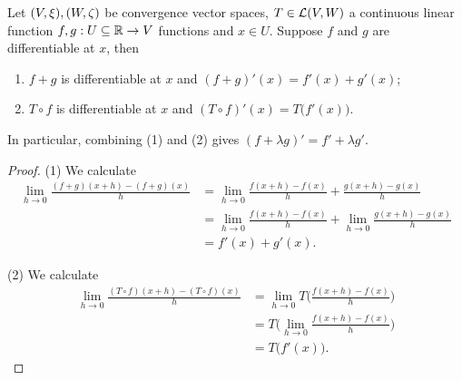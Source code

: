 \begin{lemma} \label{derivativeOfConstructions}
Let $\sSet{V,\xi}, \sSet{W,\zeta}$ be convergence vector spaces, $T\in \operatorname{\mathcal{L}}(V, W)$ a continuous linear function $f,g: U\subseteq \mathbb{R} \to V$ functions and $x\in U$. Suppose $f$ and $g$ are differentiable at $x$, then
\begin{enumerate}
\item $f+g$ is differentiable at $x$ and $(f+ g)'(x) = f'(x)+ g'(x)$;
\item $T\circ f$ is differentiable at $x$ and $(T\circ f)'(x) = T\big(f'(x)\big)$.
\end{enumerate}
\end{lemma}
In particular, combining (1) and (2) gives $(f+\lambda g)' = f'+\lambda g'$.
\begin{proof}
(1) We calculate
\begin{align*}
\lim_{h\to 0} \frac{(f+g)(x+h) - (f+g)(x)}{h} &= \lim_{h\to 0} \frac{f(x+h) - f(x)}{h} + \frac{g(x+h) - g(x)}{h} \\
&= \lim_{h\to 0} \frac{f(x+h) - f(x)}{h} + \lim_{h\to 0}\frac{g(x+h) - g(x)}{h} \\
&= f'(x) + g'(x).
\end{align*}

(2) We calculate
\begin{align*}
\lim_{h\to 0} \frac{(T\circ f)(x+h) - (T\circ f)(x)}{h} &= \lim_{h\to 0} T\Big(\frac{f(x+h)-f(x)}{h}\Big) \\
&= T\Big(\lim_{h\to 0} \frac{f(x+h)-f(x)}{h}\Big) \\
&= T\big(f'(x)\big).
\end{align*}
\end{proof}



